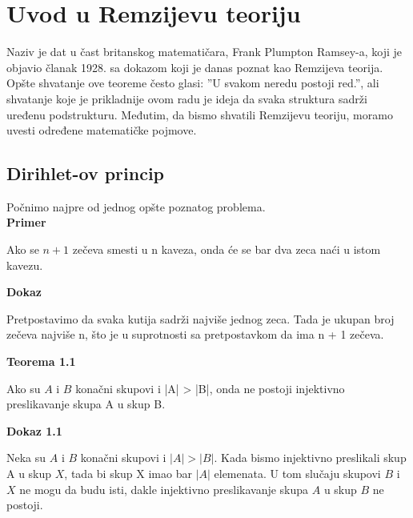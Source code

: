 \documentclass[12pt,a4paper]{article}
\begin{document}
	
	\tableofcontents
	\newpage
	
	\section{Uvod u Remzijevu teoriju}
	
	\noindent Naziv je dat u čast britanskog matematičara, Frank Plumpton Ramsey-a, koji je objavio članak
	1928. sa dokazom koji je danas poznat kao Remzijeva teorija. Opšte shvatanje ove teoreme često glasi:
	''U svakom neredu postoji red.'', ali shvatanje koje je prikladnije ovom radu je ideja da svaka
	struktura sadrži uređenu podstrukturu. Međutim, da bismo shvatili Remzijevu teoriju, moramo uvesti
	određene matematičke pojmove.

	\subsection{Dirihlet-ov princip}
	\vspace{0.5em}
	
	Počnimo najpre od jednog opšte poznatog problema.	
	\vspace{0.5em}
	\\
	{\noindent\fontsize{12pt}{12pt}\textbf{Primer}}
	\vspace{0.5em}
 	
	\noindent Ako se $n + 1$ zečeva smesti u n kaveza, onda će se bar dva zeca naći u istom kavezu.
	\vspace{1.5em}

	{\noindent\fontsize{12pt}{12pt}\textbf{Dokaz}}
	\vspace{0.5em}	

	\noindent Pretpostavimo da svaka kutija sadrži najviše jednog zeca. Tada je ukupan broj zečeva
	najviše n, što je u suprotnosti sa pretpostavkom da ima n + 1 zečeva. 
	\vspace{1.5em}	

	{\noindent\fontsize{12pt}{12pt}\textbf{Teorema 1.1}}
	\vspace{0.5em}

	\noindent Ako su $A$ i $B$ konačni skupovi i |A| > |B|, onda ne postoji injektivno preslikavanje skupa A u
	skup B.
	\vspace{1.5em}

	{\noindent\fontsize{12pt}{12pt}\textbf{Dokaz 1.1}}
	\vspace{0.5em}	

	\noindent Neka su $A$ i $B$ konačni skupovi i $|A| > |B|$. Kada bismo injektivno preslikali skup A
	u skup $X$, tada bi skup X imao bar $|A|$ elemenata. U tom slučaju skupovi $B$ i $X$ ne mogu da budu isti, dakle injektivno preslikavanje skupa $A$ u skup $B$ ne postoji.
\end{document}
